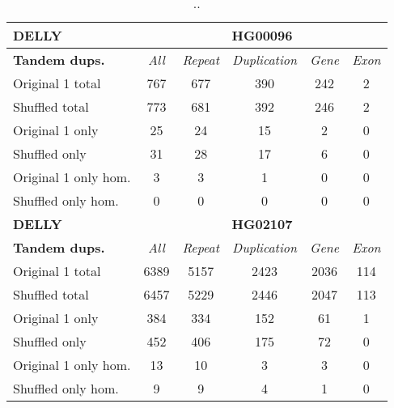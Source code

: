 \begin{table}[htb]
\begin{center}
\begin{tabular}{|l|c||c|c|c|c|}
\hline
{\bf DELLY} & \multicolumn{5}{|c|}{\bf HG00096} \\
\hline
\cline{2-6}
{\bf Tandem dups.} & {\it All} & {\it Repeat} & {\it Duplication} & {\it Gene} & {\it Exon} \\
\hline
Original 1 total & 767 & 677 & 390 & 242 & 2\\ 
\hline
Shuffled total & 773 & 681 & 392 & 246 & 2\\ 
\hline
Original 1 only & 25 & 24 & 15 & 2 & 0\\ 
\hline
Shuffled only & 31 & 28 & 17 & 6 & 0\\ 
\hline
Original 1 only hom. & 3 & 3 & 1 & 0 & 0\\ 
\hline
Shuffled only hom. & 0 & 0 & 0 & 0 & 0\\ 
\hline
\hline
{\bf DELLY} & \multicolumn{5}{|c|}{\bf HG02107} \\
\hline
\cline{2-6}
{\bf Tandem dups.} & {\it All} & {\it Repeat} & {\it Duplication} & {\it Gene} & {\it Exon} \\
\hline
Original 1 total & 6389 & 5157 & 2423 & 2036 & 114\\ 
\hline
Shuffled total & 6457 & 5229 & 2446 & 2047 & 113\\ 
\hline
Original 1 only & 384 & 334 & 152 & 61 & 1\\ 
\hline
Shuffled only & 452 & 406 & 175 & 72 & 0\\ 
\hline
Original 1 only hom. & 13 & 10 & 3 & 3 & 0\\ 
\hline
Shuffled only hom. & 9 & 9 & 4 & 1 & 0\\ 
\hline
\end{tabular}
\end{center}
\caption{ .. }
\label{tab:orig-vs-shuf-delly-dups}
\end{table}

